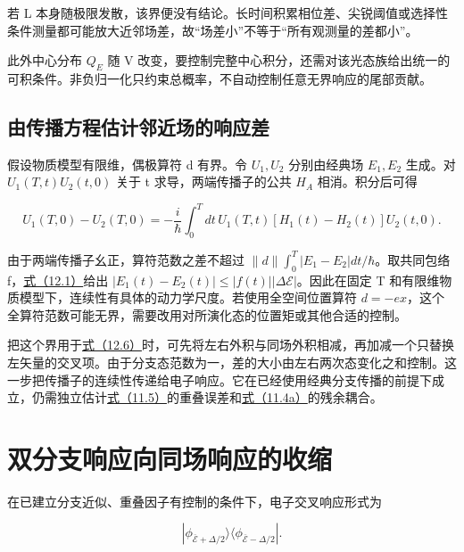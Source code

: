 \documentclass[UTF8,a4paper,zihao=-4,openany,fontset=fandol]{ctexbook}
\begin{document}
若 L 本身随极限发散，该界便没有结论。长时间积累相位差、尖锐阈值或选择性条件测量都可能放大近邻场差，故“场差小”不等于“所有观测量的差都小”。



此外中心分布 $Q_E$ 随 V 改变，要控制完整中心积分，还需对该光态族给出统一的可积条件。非负归一化只约束总概率，不自动控制任意无界响应的尾部贡献。



\subsection{由传播方程估计邻近场的响应差}


假设物质模型有限维，偶极算符 d 有界。令 $U_1,U_2$ 分别由经典场 $E_1,E_2$ 生成。对 $U_1(T,t)U_2(t,0)$ 关于 t 求导，两端传播子的公共 $H_A$ 相消。积分后可得



\begin{equation*}
U_1(T,0)-U_2(T,0)
=-\frac{i}{\hbar}\int_0^T dt\,
U_1(T,t)[H_1(t)-H_2(t)]U_2(t,0).
\tag{12.5a}\label{eq:12.5a}
\end{equation*}


由于两端传播子幺正，算符范数之差不超过 $\|d\|\int_0^T|E_1-E_2|dt/\hbar$。取共同包络 f，\hyperref[eq:12.1]{式（12.1）}给出 $|E_1(t)-E_2(t)|\le |f(t)||\Delta\mathcal E|$。因此在固定 T 和有限维物质模型下，连续性有具体的动力学尺度。若使用全空间位置算符 $d=-ex$，这个全算符范数可能无界，需要改用对所演化态的位置矩或其他合适的控制。



把这个界用于\hyperref[eq:12.6]{式（12.6）}时，可先将左右外积与同场外积相减，再加减一个只替换左矢量的交叉项。由于分支态范数为一，差的大小由左右两次态变化之和控制。这一步把传播子的连续性传递给电子响应。它在已经使用经典分支传播的前提下成立，仍需独立估计\hyperref[eq:11.5]{式（11.5）}的重叠误差和\hyperref[eq:11.4a]{式（11.4a）}的残余耦合。



\section{双分支响应向同场响应的收缩}\label{sec:12:8}


在已建立分支近似、重叠因子有控制的条件下，电子交叉响应形式为



\begin{equation*}
|\phi_{\overline{\mathcal E}+\Delta/2}\rangle
\langle\phi_{\overline{\mathcal E}-\Delta/2}|.
\tag{12.6}\label{eq:12.6}
\end{equation*}
\end{document}
